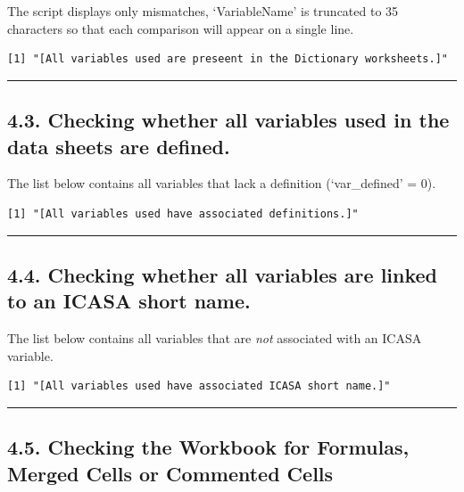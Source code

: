 \documentclass[
]{article}
\begin{document}
The script displays only mismatches, `VariableName' is truncated to 35
characters so that each comparison will appear on a single line.

\begin{verbatim}
[1] "[All variables used are preseent in the Dictionary worksheets.]"
\end{verbatim}

\begin{center}\rule{0.5\linewidth}{0.5pt}\end{center}

\subsection{4.3. Checking whether all variables used in the data sheets
are
defined.}\label{checking-whether-all-variables-used-in-the-data-sheets-are-defined.}

The list below contains all variables that lack a definition
(`var\_defined' = 0).

\begin{verbatim}
[1] "[All variables used have associated definitions.]"
\end{verbatim}

\begin{center}\rule{0.5\linewidth}{0.5pt}\end{center}

\subsection{4.4. Checking whether all variables are linked to an ICASA
short
name.}\label{checking-whether-all-variables-are-linked-to-an-icasa-short-name.}

The list below contains all variables that are \emph{not} associated
with an ICASA variable.

\begin{verbatim}
[1] "[All variables used have associated ICASA short name.]"
\end{verbatim}

\begin{center}\rule{0.5\linewidth}{0.5pt}\end{center}

\subsection{4.5. Checking the Workbook for Formulas, Merged Cells or
Commented
Cells}\label{checking-the-workbook-for-formulas-merged-cells-or-commented-cells}
\end{document}
